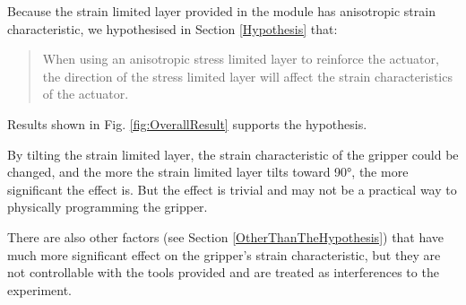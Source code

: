 \documentclass[conference]{IEEEtran}
\begin{document}
Because the strain limited layer provided in the module has anisotropic strain characteristic, we hypothesised in Section \ref{Hypothesis} that:

\begin{quote}
When using an anisotropic stress limited layer to reinforce the actuator, the direction of the stress limited layer will affect the strain characteristics of the actuator.
\end{quote}

Results shown in Fig. \ref{fig:OverallResult} supports the hypothesis. 

By tilting the strain limited layer, the strain characteristic of the gripper could be changed, and the more the strain limited layer tilts toward 90°, the more significant the effect is. But the effect is trivial and may not be a practical way to physically programming the gripper.


There are also other factors (see Section \ref{OtherThanTheHypothesis}) that have much more significant effect on the gripper's strain characteristic, but they are not controllable with the tools provided and are treated as interferences to the experiment.
\end{document}
